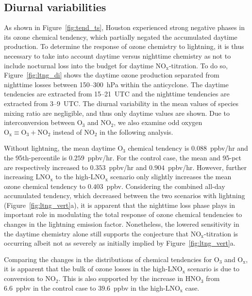 \subsection{Diurnal variabilities}

As shown in Figure~\ref{fig:tend_ts}, Houston experienced strong negative phases in its ozone chemical tendency,
which partially negated the accumulated daytime production. To determine the
response of ozone chemistry to lightning, it is thus necessary to take into account
daytime versus nighttime chemistry as not to include nocturnal loss into the budget
for daytime NO$_{\mathrm{x}}$-titration. To do so, Figure~\ref{fig:ltng_di} shows the
daytime ozone production separated from nighttime losses between 150--300~hPa within
the anticyclone. The daytime tendencies are extracted from 15--21~UTC and the
nighttime tendencies are extracted from 3--9~UTC. The diurnal variability in the
mean values of species mixing ratio are negligible, and thus only daytime values
are shown. Due to interconversion between O$_3$ and NO$_2$, we also examine
odd oxygen $\mathrm{O_x\equiv O_3+NO_2}$ instead of NO$_2$ in the following
analysis.

Without lightning, the mean daytime O$_3$ chemical tendency is $0.088$~ppbv/hr and the
95th-percentile is $0.259$~ppbv/hr. For the control case, the mean
and 95-pct are respectively increased to $0.353$~ppbv/hr and $0.904$~ppbv/hr.
However, further increasing LNO$_\mathrm{x}$ to the high-LNO$_\mathrm{x}$
scenario only slightly increases the mean ozone chemical tendency to $0.403$~ppbv.
Considering the combined all-day accumulated tendency, which decreased
between the two scenarios with lightning (Figure~\ref{fig:ltng_vert}a), it is apparent
that the nighttime loss phase plays in important role in modulating the total
response of ozone chemical tendencies to changes in the lightning emission factor.
Nonetheless, the lowered sensitivity in the daytime chemistry alone still supports
the conjecture that NO$_\mathrm{x}$-titration is occurring albeit not as severely
as initially implied by Figure~\ref{fig:ltng_vert}a.

Comparing the changes in the distributions of chemical tendencies for
O$_3$ and O$_{\mathrm{x}}$, it is apparent that the bulk of ozone losses in the
high-LNO$_{\mathrm{x}}$ scenario is due to conversion to NO$_2$. This is also
supported by the increase in HNO$_3$ from 6.6~ppbv in the control
case to 39.6~ppbv in the high-LNO$_{\mathrm{x}}$ case.

